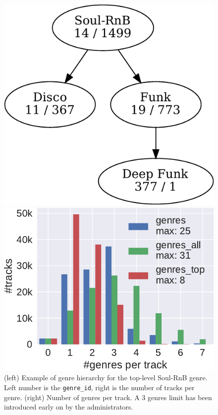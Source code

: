 \documentclass{article}
\begin{document}
\begin{figure}
	\begin{minipage}[t]{0.44\linewidth}
		\centering
		\includegraphics[width=\linewidth]{genre_hierarchy.pdf}
	\end{minipage} \hfill
	\begin{minipage}[t]{0.55\linewidth}
		\centering
		\includegraphics[width=\linewidth]{genres_per_track.pdf}
	\end{minipage}
	\caption{(left) Example of genre hierarchy for the top-level Soul-RnB genre. Left number is the \texttt{genre\_id}, right is the number of tracks per genre. (right) Number of genres per track. A 3 genres limit has been introduced early on by the administrators.}
	\label{fig:genre_hierarchy}
	\label{fig:genres_per_track}
\end{figure}
\end{document}
